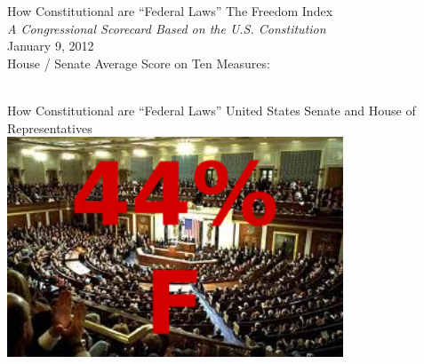 \begin{frame}{How Constitutional are ``Federal Laws''}
    \centering
    { \Huge{The Freedom Index} } \\
    \vspace{10pt}
    \emph{A Congressional Scorecard Based on the U.S. Constitution} \\
    \pause
    January 9, 2012 \\
    \vspace{15pt}
    House / Senate Average Score on Ten Measures: \\
    \vspace{20pt}
    \pause
     \\
\end{frame}

\begin{frame}{How Constitutional are ``Federal Laws''}
    \centering
    { \Large{United States Senate and House of Representatives }} \\
    \vspace{20pt}
    \includegraphics[width=0.75\textwidth]{img/house-senate-fail.png} \\
\end{frame}


